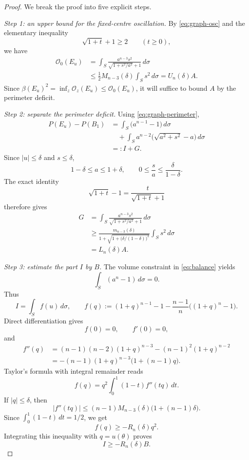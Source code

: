 \documentclass[11pt]{amsart}
\theoremstyle{definition}
\newcommand{\Per}{P}
\newcommand{\osc}{\mathcal O}
\begin{document}
\begin{proof}
We break the proof into five explicit steps.

\smallskip\noindent\emph{Step 1: an upper bound for the fixed-centre
oscillation.}
By \eqref{eq:graph-osc} and the elementary inequality
\[
   \sqrt{1+t}+1\ge2\qquad(t\ge0),
\]
we have
\[
\begin{aligned}
   \osc_0(E_u)
   &=\int_S
       \frac{a^{n-3}s^2}{\sqrt{1+s^2/a^2}+1}\,d\sigma \\
   &\le \frac12M_{n-3}(\delta)\int_Ss^2\,d\sigma
    =U_n(\delta)A.
\end{aligned}
\tag{3.22}\label{eq:O-upper}
\]
Since \(\beta(E_u)^2=\inf_z\osc_z(E_u)\le\osc_0(E_u)\), it will suffice to
bound \(A\) by the perimeter deficit.

\smallskip\noindent\emph{Step 2: separate the perimeter deficit.}
Using \eqref{eq:graph-perimeter},
\[
\begin{aligned}
   \Per(E_u)-\Per(B_1)
   &=\int_S\bigl(a^{n-1}-1\bigr)\,d\sigma \\
   &\quad+
     \int_Sa^{n-2}\bigl(\sqrt{a^2+s^2}-a\bigr)\,d\sigma \\
   &=:I+G.
\end{aligned}
\tag{3.23}\label{eq:def-split}
\]
Since \(|u|\le\delta\) and \(s\le\delta\),
\[
   1-\delta\le a\le1+\delta,\qquad
   0\le\frac{s}{a}\le\frac{\delta}{1-\delta}.
\]
The exact identity
\[
   \sqrt{1+t}-1=\frac{t}{\sqrt{1+t}+1}
\]
therefore gives
\[
\begin{aligned}
   G
   &=\int_S
       \frac{a^{n-3}s^2}{\sqrt{1+s^2/a^2}+1}\,d\sigma \\
   &\ge
      \frac{m_{n-3}(\delta)}
      {1+\sqrt{1+\bigl(\delta/(1-\delta)\bigr)^2}}
      \int_Ss^2\,d\sigma \\
   &=L_n(\delta)A.
\end{aligned}
\tag{3.24}\label{eq:G-lower}
\]

\smallskip\noindent\emph{Step 3: estimate the part \(I\) by \(B\).}
The volume constraint in \eqref{eq:balance} yields
\[
   \int_S(a^n-1)\,d\sigma=0.
\]
Thus
\[
   I=\int_S f(u)\,d\sigma,
\qquad
   f(q):=(1+q)^{n-1}-1-\frac{n-1}{n}\bigl((1+q)^n-1\bigr).
\tag{3.25}\label{eq:def-f}
\]
Direct differentiation gives
\[
   f(0)=0,\qquad f'(0)=0,
\]
and
\[
\begin{aligned}
   f''(q)
   &=(n-1)(n-2)(1+q)^{n-3}
      -(n-1)^2(1+q)^{n-2} \\
   &=-(n-1)(1+q)^{n-3}\bigl(1+(n-1)q\bigr).
\end{aligned}
\tag{3.26}\label{eq:f-second}
\]
Taylor's formula with integral remainder reads
\[
   f(q)=q^2\int_0^1(1-t)f''(tq)\,dt.
\]
If \(|q|\le\delta\), then
\[
   |f''(tq)|
   \le(n-1)M_{n-3}(\delta)\bigl(1+(n-1)\delta\bigr).
\]
Since \(\int_0^1(1-t)\,dt=1/2\), we get
\[
   f(q)\ge-R_n(\delta)q^2.
\]
Integrating this inequality with \(q=u(\theta)\) proves
\[
   I\ge-R_n(\delta)B.
\tag{3.27}\label{eq:I-lower}
\]


\end{proof}
\end{document}
